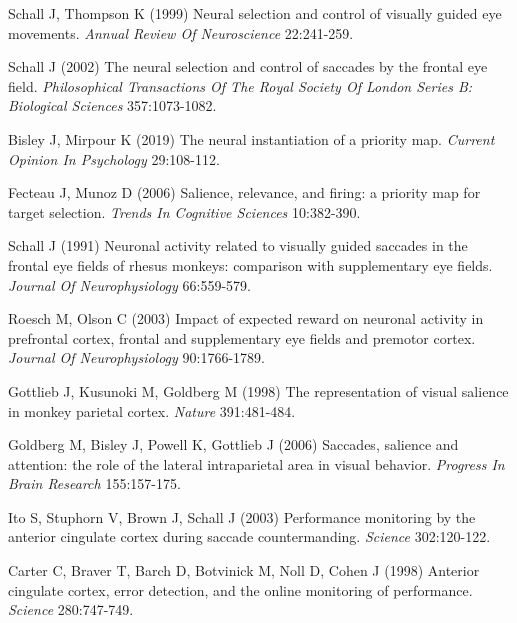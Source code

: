\documentclass{ar-1col}
\begin{document}
{\begin{thebibliography}{00}
Schall J, Thompson K (1999) 
Neural selection and control of visually guided eye movements.
\textit{ Annual Review Of Neuroscience} 22:241-259.

Schall J (2002) 
The neural selection and control of saccades by the frontal eye field.
\textit{ Philosophical Transactions Of The Royal Society Of London Series B: Biological Sciences} 357:1073-1082.

Bisley J, Mirpour K (2019) 
The neural instantiation of a priority map.
\textit{ Current Opinion In Psychology} 29:108-112.

Fecteau J, Munoz D (2006) 
Salience, relevance, and firing: a priority map for target selection.
\textit{ Trends In Cognitive Sciences} 10:382-390.

Schall J (1991) 
Neuronal activity related to visually guided saccades in the frontal eye fields of rhesus monkeys: comparison with supplementary eye fields.
\textit{ Journal Of Neurophysiology} 66:559-579.

Roesch M, Olson C (2003) 
Impact of expected reward on neuronal activity in prefrontal cortex, frontal and supplementary eye fields and premotor cortex.
\textit{ Journal Of Neurophysiology} 90:1766-1789.

Gottlieb J, Kusunoki M, Goldberg M (1998) 
The representation of visual salience in monkey parietal cortex.
\textit{ Nature} 391:481-484.

Goldberg M, Bisley J, Powell K, Gottlieb J (2006) 
Saccades, salience and attention: the role of the lateral intraparietal area in visual behavior.
\textit{ Progress In Brain Research} 155:157-175.

Ito S, Stuphorn V, Brown J, Schall J (2003) 
Performance monitoring by the anterior cingulate cortex during saccade countermanding.
\textit{ Science} 302:120-122.

Carter C, Braver T, Barch D, Botvinick M, Noll D, Cohen J (1998) 
Anterior cingulate cortex, error detection, and the online monitoring of performance.
\textit{ Science} 280:747-749.


\end{thebibliography}}
\end{document}
